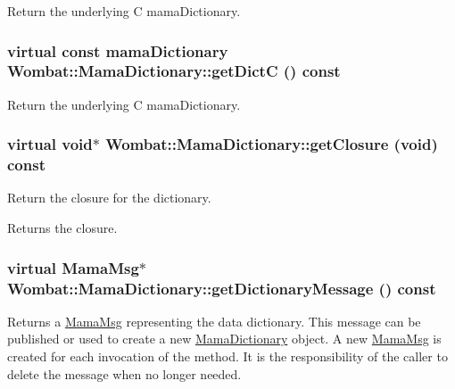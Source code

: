 Return the underlying C mamaDictionary. \hypertarget{classWombat_1_1MamaDictionary_a91df6b193f572a92f0c4c0520391c330}{
\subsubsection[{getDictC}]{\setlength{\rightskip}{0pt plus 5cm}virtual const mamaDictionary Wombat::MamaDictionary::getDictC () const}}
\label{classWombat_1_1MamaDictionary_a91df6b193f572a92f0c4c0520391c330}


Return the underlying C mamaDictionary. \hypertarget{classWombat_1_1MamaDictionary_a7827c7dbb1da954ba37950a56697c2e9}{
\subsubsection[{getClosure}]{\setlength{\rightskip}{0pt plus 5cm}virtual void$\ast$ Wombat::MamaDictionary::getClosure (void) const}}
\label{classWombat_1_1MamaDictionary_a7827c7dbb1da954ba37950a56697c2e9}


Return the closure for the dictionary. \begin{DoxyReturn}{Returns}
the closure. 
\end{DoxyReturn}
\hypertarget{classWombat_1_1MamaDictionary_ad1852a80f43d4fc41de56fcac328d3a6}{
\subsubsection[{getDictionaryMessage}]{\setlength{\rightskip}{0pt plus 5cm}virtual {\bf MamaMsg}$\ast$ Wombat::MamaDictionary::getDictionaryMessage () const}}
\label{classWombat_1_1MamaDictionary_ad1852a80f43d4fc41de56fcac328d3a6}


Returns a \hyperlink{classWombat_1_1MamaMsg}{MamaMsg} representing the data dictionary. This message can be published or used to create a new \hyperlink{classWombat_1_1MamaDictionary}{MamaDictionary} object. A new \hyperlink{classWombat_1_1MamaMsg}{MamaMsg} is created for each invocation of the method. It is the responsibility of the caller to delete the message when no longer needed.

